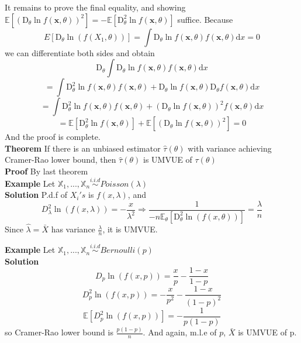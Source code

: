 It remains to prove the final equality, and showing $\mathbb{E}[(\mathrm{D}_{\theta} \ln f(\textbf{x}, \theta))^2] = - \mathbb{E}[ \mathrm{D}^2_\theta \ln f(\textbf{x}, \theta) ]$ suffice. Because
$$E[\mathrm{D}_\theta \ln(f(X_1, \theta))] = \int \mathrm{D}_\theta \ln f(\textbf{x}, \theta) f(\textbf{x}, \theta) \mathrm{d}x= 0$$
we can differentiate both sides and obtain
$$\mathrm{D}_\theta \int \mathrm{D}_\theta \ln f(\textbf{x}, \theta) f(\textbf{x}, \theta) \mathrm{d}x$$
$$= \int \mathrm{D}^2_\theta \ln f(\textbf{x}, \theta) f(\textbf{x}, \theta) + \mathrm{D}_\theta \ln f(\textbf{x}, \theta) \mathrm{D}_\theta f(\textbf{x}, \theta) \mathrm{d}x$$
$$= \int \mathrm{D}^2_\theta \ln f(\textbf{x}, \theta) f(\textbf{x}, \theta) + (\mathrm{D}_\theta \ln f(\textbf{x}, \theta))^2 f(\textbf{x}, \theta) \mathrm{d}x$$
$$= \mathbb{E}[ \mathrm{D}^2_\theta \ln f(\textbf{x}, \theta) ] + \mathbb{E}[(\mathrm{D}_{\theta} \ln f(\textbf{x}, \theta))^2] = 0$$
And the proof is complete.\\

\textbf{Theorem} If there is an unbiased estimator $\hat{\tau}(\theta)$ with variance achieving Cramer-Rao lower bound, then $\hat{\tau}(\theta)$ is UMVUE of $\tau(\theta)$\\

\textbf{Proof} By last theorem\\

\textbf{Example} Let $\mathbb{X}_1, ..., \mathbb{X}_n \overset{i.i.d}{\sim} Poisson(\lambda)$\\

\textbf{Solution} P.d.f of $X_i's$ is $f(x, \lambda)$, and
$$D_\lambda^2 \ln(f(x, \lambda)) = -\frac{x}{\lambda^2} \Rightarrow \frac{1}{-n\mathbb{E}_\theta
[\mathrm{D}_\theta^2 \ln(f(x, \theta))]} = \frac{\lambda}{n}$$
Since $\hat{\lambda} = \bar{X}$ has variance $\frac{\lambda}{n}$, it is UMVUE.

\textbf{Example} Let $\mathbb{X}_1, ..., \mathbb{X}_n \overset{i.i.d}{\sim} Bernoulli(p)$\\

\textbf{Solution} 
$$D_p \ln(f(x, p)) = \frac{x}{p} - \frac{1-x}{1-p}$$
$$D_p^2 \ln(f(x, p)) = -\frac{x}{p^2} - \frac{1-x}{(1-p)^2}$$
$$\mathbb{E}[ D_p^2 \ln(f(x, p)) ] = -\frac{1}{p(1-p)}$$
so Cramer-Rao lower bound is $\frac{p(1-p)}{n}$. And again, m.l.e of $p$, $\bar{X}$ is UMVUE of p.